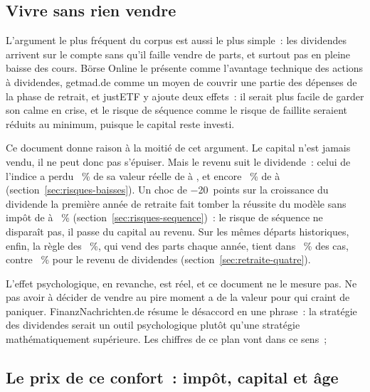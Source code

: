 \subsection{Vivre sans rien vendre}\label{sec:presse-sans-vendre}

L'argument le plus fr\'equent du corpus est aussi le plus simple~: les dividendes arrivent sur le
compte sans qu'il faille vendre de parts, et surtout pas en pleine baisse des cours. B\"orse Online
le pr\'esente comme l'avantage technique des actions \`a dividendes,
getmad.de comme un moyen de couvrir une partie des d\'epenses de la phase de retrait,
et justETF y ajoute deux effets~: il serait plus facile de garder son calme en crise, et le risque de
s\'equence comme le risque de faillite seraient r\'eduits au minimum, puisque le capital reste
investi.

Ce document donne raison \`a la moiti\'e de cet argument. Le capital n'est jamais vendu, il ne peut
donc pas s'\'epuiser. Mais le revenu suit le dividende~: celui de l'indice \IndiceActionsUs{} a perdu
\GroessterEinbruch~\% de sa valeur r\'eelle de \GroessterEinbruchDebut{} \`a \GroessterEinbruchJahr, et
encore \EinbruchRecent~\% de \EinbruchRecentDebut{} \`a \EinbruchRecentFin{}
(section~\ref{sec:risques-baisses}). Un choc de $-$20~points sur la croissance du dividende la
premi\`ere ann\'ee de retraite fait tomber la r\'eussite du mod\`ele sans imp\^ot de
\ErfolgsquoteBasis{} \`a \McErfolgChocMoinsVingt~\% (section~\ref{sec:risques-sequence})~: le risque
de s\'equence ne dispara\^it pas, il passe du capital au revenu. Sur les m\^emes d\'eparts historiques,
enfin, la r\`egle des \TauxRetrait~\%, qui vend des parts chaque ann\'ee, tient dans
\RetraitHistMemesDepartsProzent~\% des cas, contre \RueckspielTenusProzent~\% pour le revenu de
dividendes (section~\ref{sec:retraite-quatre}).

L'effet psychologique, en revanche, est r\'eel, et ce document ne le mesure pas. Ne pas avoir \`a
d\'ecider de vendre au pire moment a de la valeur pour qui craint de paniquer. FinanzNachrichten.de
r\'esume le d\'esaccord en une phrase~: la strat\'egie des dividendes serait un outil psychologique
plut\^ot qu'une strat\'egie math\'ematiquement sup\'erieure. Les chiffres
de ce plan vont dans ce sens~; 

\subsection{Le prix de ce confort~: imp\^ot, capital et \^age}\label{sec:presse-prix}

